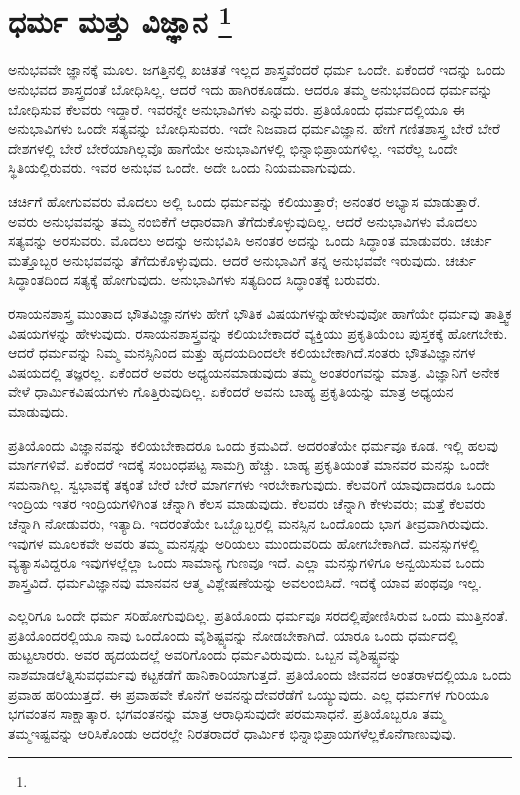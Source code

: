 
\chapter[ಧರ್ಮ ಮತ್ತು ವಿಜ್ಞಾನ ]{ಧರ್ಮ ಮತ್ತು ವಿಜ್ಞಾನ \protect\footnote{}}

ಅನುಭವವೇ ಜ್ಞಾನಕ್ಕೆ ಮೂಲ. ಜಗತ್ತಿನಲ್ಲಿ ಖಚಿತತೆ ಇಲ್ಲದ ಶಾಸ್ತ್ರವೆಂದರೆ ಧರ್ಮ ಒಂದೇ. ಏಕೆಂದರೆ ಇದನ್ನು ಒಂದು ಅನುಭವದ ಶಾಸ್ತ್ರದಂತೆ ಬೋಧಿಸಿಲ್ಲ. ಆದರೆ ಇದು ಹಾಗಿರಕೂಡದು. ಆದರೂ ತಮ್ಮ ಅನುಭವದಿಂದ ಧರ್ಮವನ್ನು ಬೋಧಿಸುವ ಕೆಲವರು ಇದ್ದಾರೆ. ಇವರನ್ನೇ ಅನುಭಾವಿಗಳು ಎನ್ನುವರು. ಪ್ರತಿಯೊಂದು ಧರ್ಮದಲ್ಲಿಯೂ ಈ ಅನುಭಾವಿಗಳು ಒಂದೇ ಸತ್ಯವನ್ನು ಬೋಧಿಸುವರು. ಇದೇ ನಿಜವಾದ ಧರ್ಮವಿಜ್ಞಾನ. ಹೇಗೆ ಗಣಿತಶಾಸ್ತ್ರ ಬೇರೆ ಬೇರೆ ದೇಶಗಳಲ್ಲಿ ಬೇರೆ ಬೇರೆಯಾಗಿಲ್ಲವೊ ಹಾಗೆಯೇ ಅನುಭಾವಿಗಳಲ್ಲಿ ಭಿನ್ನಾಭಿಪ್ರಾಯಗಳಿಲ್ಲ. ಇವರೆಲ್ಲ ಒಂದೇ ಸ್ಥಿತಿಯಲ್ಲಿರುವರು. ಇವರ ಅನುಭವ ಒಂದೇ. ಅದೇ ಒಂದು ನಿಯಮವಾಗುವುದು.

ಚರ್ಚಿಗೆ ಹೋಗುವವರು ಮೊದಲು ಅಲ್ಲಿ ಒಂದು ಧರ್ಮವನ್ನು ಕಲಿಯುತ್ತಾರೆ; ಅನಂತರ ಅಭ್ಯಾಸ ಮಾಡುತ್ತಾರೆ. ಅವರು ಅನುಭವವನ್ನು ತಮ್ಮ ನಂಬಿಕೆಗೆ ಆಧಾರವಾಗಿ ತೆಗೆದುಕೊಳ್ಳುವುದಿಲ್ಲ. ಆದರೆ ಅನುಭಾವಿಗಳು ಮೊದಲು ಸತ್ಯವನ್ನು ಅರಸುವರು. ಮೊದಲು ಅದನ್ನು ಅನುಭವಿಸಿ ಅನಂತರ ಅದನ್ನು ಒಂದು ಸಿದ್ಧಾಂತ ಮಾಡುವರು. ಚರ್ಚು ಮತ್ತೊಬ್ಬರ ಅನುಭವವನ್ನು ತೆಗೆದುಕೊಳ್ಳುವುದು. ಆದರೆ ಅನುಭಾವಿಗೆ ತನ್ನ ಅನುಭವವೇ ಇರುವುದು. ಚರ್ಚು ಸಿದ್ಧಾಂತದಿಂದ ಸತ್ಯಕ್ಕೆ ಹೋಗುವುದು. ಅನುಭಾವಿಗಳು ಸತ್ಯದಿಂದ ಸಿದ್ಧಾಂತಕ್ಕೆ ಬರುವರು.

ರಸಾಯನಶಾಸ್ತ್ರ ಮುಂತಾದ ಭೌತವಿಜ್ಞಾನಗಳು ಹೇಗೆ ಭೌತಿಕ ವಿಷಯಗಳನ್ನು\break ಹೇಳುವುವೋ ಹಾಗೆಯೇ ಧರ್ಮವು ತಾತ್ತ್ವಿಕ ವಿಷಯಗಳನ್ನು ಹೇಳುವುದು. ರಸಾಯನಶಾಸ್ತ್ರವನ್ನು ಕಲಿಯಬೇಕಾದರೆ ವ್ಯಕ್ತಿಯು ಪ್ರಕೃತಿಯೆಂಬ ಪುಸ್ತಕಕ್ಕೆ ಹೋಗಬೇಕು. ಆದರೆ ಧರ್ಮವನ್ನು ನಿಮ್ಮ ಮನಸ್ಸಿನಿಂದ ಮತ್ತು ಹೃದಯದಿಂದಲೇ ಕಲಿಯಬೇಕಾಗಿದೆ.\break ಸಂತರು ಭೌತವಿಜ್ಞಾನಗಳ ವಿಷಯದಲ್ಲಿ ತಜ್ಞರಲ್ಲ. ಏಕೆಂದರೆ ಅವರು ಅಧ್ಯಯನ\break ಮಾಡುವುದು ತಮ್ಮ ಅಂತರಂಗವನ್ನು ಮಾತ್ರ. ವಿಜ್ಞಾನಿಗೆ ಅನೇಕ ವೇಳೆ ಧಾರ್ಮಿಕ\break ವಿಷಯಗಳು ಗೊತ್ತಿರುವುದಿಲ್ಲ. ಏಕೆಂದರೆ ಅವನು ಬಾಹ್ಯ ಪ್ರಕೃತಿಯನ್ನು ಮಾತ್ರ ಅಧ್ಯಯನ ಮಾಡುವುದು.

ಪ್ರತಿಯೊಂದು ವಿಜ್ಞಾನವನ್ನು ಕಲಿಯಬೇಕಾದರೂ ಒಂದು ಕ್ರಮವಿದೆ. ಅದರಂತೆಯೇ ಧರ್ಮವೂ ಕೂಡ. ಇಲ್ಲಿ ಹಲವು ಮಾರ್ಗಗಳಿವೆ. ಏಕೆಂದರೆ ಇದಕ್ಕೆ ಸಂಬಂಧಪಟ್ಟ ಸಾಮಗ್ರಿ ಹೆಚ್ಚು. ಬಾಹ್ಯ ಪ್ರಕೃತಿಯಂತೆ ಮಾನವರ ಮನಸ್ಸು ಒಂದೇ ಸಮನಾಗಿಲ್ಲ. ಸ್ವಭಾವಕ್ಕೆ ತಕ್ಕಂತೆ ಬೇರೆ ಬೇರೆ ಮಾರ್ಗಗಳು ಇರಬೇಕಾಗುವುದು. ಕೆಲವರಿಗೆ ಯಾವುದಾದರೂ ಒಂದು ಇಂದ್ರಿಯ ಇತರ ಇಂದ್ರಿಯಗಳಿಗಿಂತ ಚೆನ್ನಾಗಿ ಕೆಲಸ ಮಾಡುವುದು. ಕೆಲವರು ಚೆನ್ನಾಗಿ ಕೇಳುವರು; ಮತ್ತೆ ಕೆಲವರು ಚೆನ್ನಾಗಿ ನೋಡುವರು, ಇತ್ಯಾದಿ. ಇದರಂತೆಯೇ ಒಬ್ಬೊಬ್ಬರಲ್ಲಿ ಮನಸ್ಸಿನ ಒಂದೊಂದು ಭಾಗ ತೀವ್ರವಾಗಿರುವುದು. ಇವುಗಳ ಮೂಲಕವೇ ಅವರು ತಮ್ಮ ಮನಸ್ಸನ್ನು ಅರಿಯಲು ಮುಂದುವರಿದು ಹೋಗಬೇಕಾಗಿದೆ. ಮನಸ್ಸುಗಳಲ್ಲಿ ವ್ಯತ್ಯಾಸವಿದ್ದರೂ ಇವುಗಳಲ್ಲೆಲ್ಲಾ ಒಂದು ಸಾಮಾನ್ಯ ಗುಣವೂ ಇದೆ. ಎಲ್ಲಾ ಮನಸ್ಸುಗಳಿಗೂ ಅನ್ವಯಿಸುವ ಒಂದು ಶಾಸ್ತ್ರವಿದೆ. ಧರ್ಮವಿಜ್ಞಾನವು ಮಾನವನ ಆತ್ಮ ವಿಶ್ಲೇಷಣೆಯನ್ನು ಅವಲಂಬಿಸಿದೆ. ಇದಕ್ಕೆ ಯಾವ ಪಂಥವೂ ಇಲ್ಲ.

ಎಲ್ಲರಿಗೂ ಒಂದೇ ಧರ್ಮ ಸರಿಹೋಗುವುದಿಲ್ಲ. ಪ್ರತಿಯೊಂದು ಧರ್ಮವೂ ಸರದಲ್ಲಿ\break ಪೋಣಿಸಿರುವ ಒಂದು ಮುತ್ತಿನಂತೆ. ಪ್ರತಿಯೊಂದರಲ್ಲಿಯೂ ನಾವು ಒಂದೊಂದು ವೈಶಿಷ್ಟ್ಯವನ್ನು ನೋಡಬೇಕಾಗಿದೆ. ಯಾರೂ ಒಂದು ಧರ್ಮದಲ್ಲಿ ಹುಟ್ಟಲಾರರು. ಅವರ ಹೃದಯದಲ್ಲೆ ಅವರಿಗೊಂದು ಧರ್ಮವಿರುವುದು. ಒಬ್ಬನ ವೈಶಿಷ್ಟ್ಯವನ್ನು ನಾಶಮಾಡಲೆತ್ನಿಸುವ\break ಧರ್ಮವು ಕಟ್ಟಕಡೆಗೆ ಹಾನಿಕಾರಿಯಾಗುತ್ತದೆ. ಪ್ರತಿಯೊಂದು ಜೀವನದ ಅಂತರಾಳ\break ದಲ್ಲಿಯೂ ಒಂದು ಪ್ರವಾಹ ಹರಿಯುತ್ತದೆ. ಈ ಪ್ರವಾಹವೇ ಕೊನೆಗೆ ಅವನನ್ನು\break ದೇವರೆಡೆಗೆ ಒಯ್ಯುವುದು. ಎಲ್ಲ ಧರ್ಮಗಳ ಗುರಿಯೂ ಭಗವಂತನ ಸಾಕ್ಷಾತ್ಕಾರ. ಭಗವಂತನನ್ನು ಮಾತ್ರ ಆರಾಧಿಸುವುದೇ ಪರಮಸಾಧನೆ. ಪ್ರತಿಯೊಬ್ಬರೂ ತಮ್ಮ ತಮ್ಮ\break ಇಷ್ಟವನ್ನು ಆರಿಸಿಕೊಂಡು ಅದರಲ್ಲೇ ನಿರತರಾದರೆ ಧಾರ್ಮಿಕ ಭಿನ್ನಾಭಿಪ್ರಾಯಗಳೆಲ್ಲ\break ಕೊನೆಗಾಣುವುವು.

